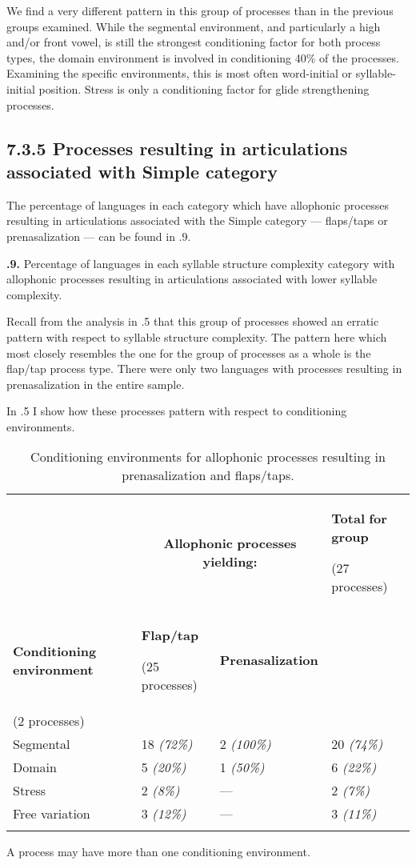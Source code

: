   We find a very different pattern in this group of processes than in the previous groups examined. While the segmental environment, and particularly a high and/or front vowel, is still the strongest conditioning factor for both process types, the domain environment is involved in conditioning 40\% of the processes. Examining the specific environments, this is most often word-initial or syllable-initial position. Stress is only a conditioning factor for glide strengthening processes.

\subsection{7.3.5 Processes resulting in articulations associated with Simple category}

  The percentage of languages in each category which have allophonic processes resulting in articulations associated with the Simple category — flaps/taps or prenasalization — can be found in .9.

\textbf{.9.} Percentage of languages in each syllable structure complexity category with allophonic processes resulting in articulations associated with lower syllable complexity.

  Recall from the analysis in .5 that this group of processes showed an erratic pattern with respect to syllable structure complexity. The pattern here which most closely resembles the one for the group of processes as a whole is the flap/tap process type. There were only two languages with processes resulting in prenasalization in the entire sample.

  In .5 I show how these processes pattern with respect to conditioning environments.

\begin{table}
\begin{tabularx}{\textwidth}{XXXX}
\lsptoprule
 & \multicolumn{2}{c}{ \textbf{Allophonic} \textbf{processes} \textbf{yielding:}} & { \textbf{Total} \textbf{for} \textbf{group}}

 (27 processes)\\
 \textbf{Conditioning} \textbf{environment} & { \textbf{Flap/tap}}

 (25 processes) & \textbf{Prenasalization}\\
(2 processes) & \\
 Segmental & 18 \textit{(72\%)} & 2 \textit{(100\%)} & 20 \textit{(74\%)}\\
 Domain & 5 \textit{(20\%)} & 1 \textit{(50\%)} & 6 \textit{(22\%)}\\
 Stress & 2 \textit{(8\%)} & — & 2 \textit{(7\%)}\\
 Free variation & 3 \textit{(12\%)} & — & 3 \textit{(11\%)}\\
\lspbottomrule
\end{tabularx}
\caption{\label{7.5}Conditioning environments for allophonic processes resulting in prenasalization and flaps/taps.}A process may have more than one conditioning environment.
\end{table}

